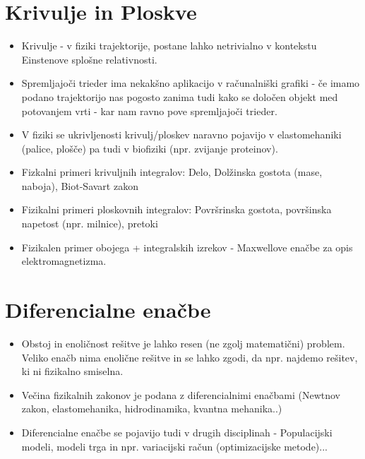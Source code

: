 \documentclass[12pt]{article}
\begin{document}
\section*{Krivulje in Ploskve}
\begin{itemize}[leftmargin=1.5em]
    \item Krivulje - v fiziki trajektorije, postane lahko netrivialno v kontekstu Einstenove splošne relativnosti.
    \item Spremljajoči trieder ima nekakšno aplikacijo v računalniški grafiki - če imamo podano trajektorijo nas pogosto zanima tudi kako se določen objekt med potovanjem vrti - kar nam ravno pove spremljajoči trieder.
    \item V fiziki se ukrivljenosti krivulj/ploskev naravno pojavijo v elastomehaniki (palice, plošče) pa tudi v biofiziki (npr. zvijanje proteinov).
    \item Fizkalni primeri krivuljnih integralov: Delo, Dolžinska gostota (mase, naboja), Biot-Savart zakon
    \item Fizikalni primeri ploskovnih integralov: Površrinska gostota, površinska napetost (npr. milnice), pretoki
    \item Fizikalen primer obojega + integralskih izrekov - Maxwellove enačbe za opis elektromagnetizma.
\end{itemize}

\section*{Diferencialne enačbe}
\begin{itemize}[leftmargin=1.5em]
    \item Obstoj in enoličnost rešitve je lahko resen (ne zgolj matematični) problem. Veliko enačb nima enolične rešitve in se lahko zgodi, da npr. najdemo rešitev, ki ni fizikalno smiselna.
    \item Večina fizikalnih zakonov je podana z diferencialnimi enačbami (Newtnov zakon, elastomehanika, hidrodinamika, kvantna mehanika..)
    \item Diferencialne enačbe se pojavijo tudi v drugih disciplinah - Populacijski modeli, modeli trga in npr. variacijski račun (optimizacijske metode)...
\end{itemize}
\end{document}
